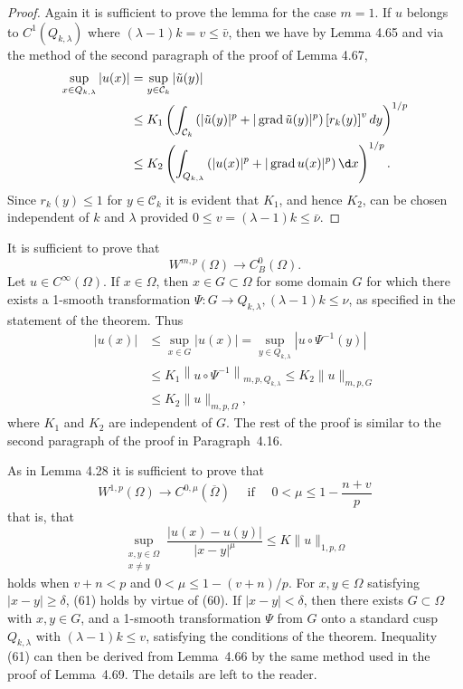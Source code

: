 \begin{proof}
  Again it is sufficient to prove the lemma for the case $m=1$.
  If $u$ belongs to $C^1\left(Q_{k, \lambda}\right)$ where $(\lambda-1) k=v \leq \bar{v}$,
  then we have by Lemma 4.65 and via the
  method of the second paragraph of the proof of Lemma 4.67,
  \[
  \begin{aligned}
  \sup _{x \in Q_{k, \lambda}}|u(x)| & =\sup _{y \in \mathcal{C}_k}|\tilde{u}(y)| \\
  & \leq K_1\left(\int_{\mathcal{C}_k}\left(|\tilde{u}(y)|^p+|\grad \tilde{u}(y)|^p\right)\left[r_k(y)\right]^v d y\right)^{1 / p} \\
  & \leq K_2\left(\int_{Q_{k, \lambda}}\left(|u(x)|^p+|\grad u(x)|^p\right) \d x\right)^{1 / p} .
  \end{aligned}
  \]
  Since $r_k(y) \leq 1$ for $y \in \mathcal{C}_k$ it is evident that $K_1$, and hence $K_2$,
  can be chosen independent of $k$ and $\lambda$ provided $0 \leq v=(\lambda-1) k \leq \bar{\nu}$.
\end{proof}


\begin{para}
  It is sufficient to prove that
  \[
  W^{m,p}(\Omega) \rightarrow C_B^0(\Omega) .
  \]
  Let $u \in C^{\infty}(\Omega)$. If $x \in \Omega$, then $x \in G \subset \Omega$ for some domain $G$
  for which there exists a 1-smooth transformation $\Psi: G \rightarrow Q_{k, \lambda},(\lambda-1) k \leq \nu$, 
  as specified in the statement of the theorem. Thus
  \[
  \begin{aligned}
  |u(x)| & \leq \sup _{x \in G}|u(x)|=\sup _{y \in Q_{k, \lambda}}\left|u \circ \Psi^{-1}(y)\right| \\
  & \leq K_1\left\|u \circ \Psi^{-1}\right\|_{m, p, Q_{k, \lambda}} \leq K_2\|u\|_{m, p, G} \\
  & \leq K_2\|u\|_{m, p, \Omega},
  \end{aligned}
  \]
  where $K_1$ and $K_2$ are independent of $G$. The rest of the proof is similar
  to the second paragraph of the proof in Paragraph~4.16.
\end{para}

\begin{para}
  As in Lemma 4.28 it is sufficient to prove that
  \[
  W^{1, p}(\Omega) \rightarrow C^{0, \mu}(\overline{\Omega}) \quad \text { if } \quad 0<\mu \leq 1-\frac{n+v}{p}
  \]
  that is, that
  \[
  \sup _{\substack{x, y \in \Omega \\ x \neq y}} \frac{|u(x)-u(y)|}{|x-y|^\mu} \leq K\|u\|_{1, p, \Omega}
  \]
  holds when $v+n<p$ and $0<\mu \leq 1-(v+n) / p$. For $x, y \in \Omega$ satisfying $|x-y| \geq \delta$,
  (61) holds by virtue of (60). If $|x-y|<\delta$, then there exists $G \subset \Omega$ with $x, y \in G$,
  and a 1-smooth transformation $\Psi$ from $G$ onto a standard cusp $Q_{k, \lambda}$
  with $(\lambda-1) k \leq v$, satisfying the conditions of the theorem. Inequality (61)
  can then be derived from Lemma~4.66 by the same method used in the proof of Lemma~4.69.
  The details are left to the reader.
\end{para}